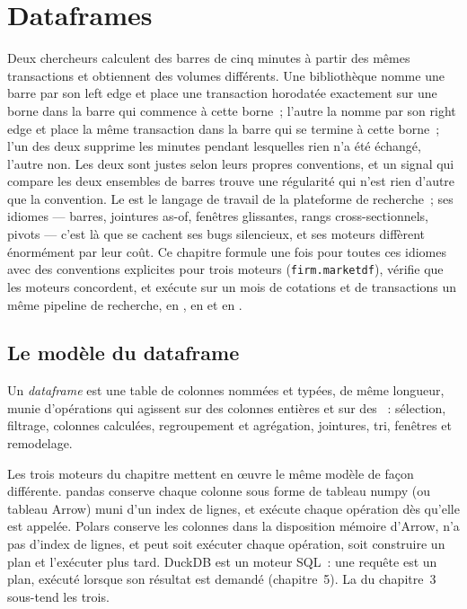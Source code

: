 \chapter{Dataframes}\label{ch:pl:dataframes}

Deux chercheurs calculent des barres de cinq minutes à partir des mêmes transactions et obtiennent des volumes différents. Une bibliothèque nomme une barre par son left
edge et place une transaction horodatée exactement sur une borne dans la barre qui commence à cette borne~; l'autre la nomme par son right edge et
place la même transaction dans la barre qui se termine à cette borne~; l'un des deux supprime les minutes pendant lesquelles rien n'a été échangé, l'autre non.
Les deux sont justes selon leurs propres conventions, et un signal qui compare les deux ensembles de barres trouve une régularité qui n'est rien d'autre que la
convention. Le  est le langage de travail de la plateforme de recherche~; ses idiomes --- barres, jointures as-of, fenêtres glissantes,
rangs cross-sectionnels, pivots --- c'est là que se cachent ses bugs silencieux, et ses moteurs diffèrent énormément par leur coût. Ce chapitre
formule une fois pour toutes ces idiomes avec des conventions explicites pour trois moteurs (\texttt{firm.marketdf}), vérifie que les moteurs concordent, et
exécute sur un mois de cotations et de transactions un même pipeline de recherche, en , en  et en .

\section{Le modèle du dataframe}

\begin{definition}[Dataframe]\label{def:pl:dataframes:dataframe}
Un \emph{dataframe} est une table de colonnes nommées et typées, de même longueur, munie d'opérations qui agissent sur des colonnes entières
et sur des ~: sélection, filtrage, colonnes calculées, regroupement et agrégation, jointures, tri, fenêtres et remodelage.
\end{definition}

Les trois moteurs du chapitre mettent en œuvre le même modèle de façon différente. pandas conserve chaque colonne sous forme de tableau numpy (ou
tableau Arrow) muni d'un index de lignes, et exécute chaque opération dès qu'elle est appelée. Polars conserve les colonnes dans la disposition mémoire d'Arrow,
n'a pas d'index de lignes, et peut soit exécuter chaque opération, soit construire un plan et l'exécuter plus tard. DuckDB est un moteur SQL~: une requête
est un plan, exécuté lorsque son résultat est demandé (chapitre~5). La  du chapitre~3 sous-tend les trois.


